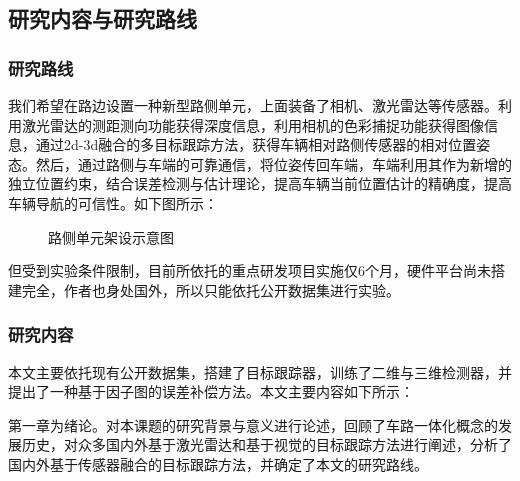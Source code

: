 \subsection{研究内容与研究路线}

\subsubsection{研究路线}

我们希望在路边设置一种新型路侧单元，上面装备了相机、激光雷达等传感器。利用激光雷达的测距测向功能获得深度信息，利用相机的色彩捕捉功能获得图像信息，通过2d-3d融合的多目标跟踪方法，获得车辆相对路侧传感器的相对位置姿态。然后，通过路侧与车端的可靠通信，将位姿传回车端，车端利用其作为新增的独立位置约束，结合误差检测与估计理论，提高车辆当前位置估计的精确度，提高车辆导航的可信性。如下图所示：

\begin{figure}[htb] 
    \caption{路侧单元架设示意图}
\end{figure}

但受到实验条件限制，目前所依托的重点研发项目实施仅6个月，硬件平台尚未搭建完全，作者也身处国外，所以只能依托公开数据集进行实验。

\subsubsection{研究内容}

本文主要依托现有公开数据集，搭建了目标跟踪器，训练了二维与三维检测器，并提出了一种基于因子图的误差补偿方法。本文主要内容如下所示：

第一章为绪论。对本课题的研究背景与意义进行论述，回顾了车路一体化概念的发展历史，对众多国内外基于激光雷达和基于视觉的目标跟踪方法进行阐述，分析了国内外基于传感器融合的目标跟踪方法，并确定了本文的研究路线。

